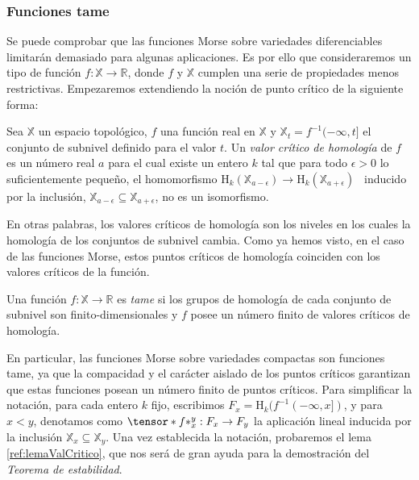 \subsubsection*{Funciones tame}
Se puede comprobar que las funciones Morse sobre variedades diferenciables limitarán demasiado para algunas aplicaciones. Es por ello que consideraremos un tipo de función $f: \mathbb{X} \to \mathbb{R}$, donde $f$ y $\mathbb{X}$ cumplen una serie de propiedades menos restrictivas. Empezaremos extendiendo la noción de punto crítico de la siguiente forma:

\begin{definition}
\begin{sloppypar}
Sea $\mathbb{X}$ un espacio topológico, $f$ una función real en $\mathbb{X}$ y ${\mathbb{X}_t=f^{-1}(-\infty, t]}$ el conjunto de subnivel definido para el valor $t$. Un \emph{valor crítico de homología} de $f$ es un número real $a$ para el cual existe un entero $k$ tal que para todo $\epsilon > 0$ lo suficientemente pequeño, el homomorfismo $\text{H}_k(\mathbb{X}_{a-\epsilon}) \to \text{H}_k(\mathbb{X}_{a+\epsilon})$ \footnotemark \ inducido por la inclusión, $\mathbb{X}_{a-\epsilon} \subseteq \mathbb{X}_{a+\epsilon}$, no es un isomorfismo.
\end{sloppypar}
\end{definition}


En otras palabras, los valores críticos de homología son los niveles en los cuales la homología de los conjuntos de subnivel cambia. Como ya hemos visto, en el caso de las funciones Morse, estos puntos críticos de homología coinciden con los valores críticos de la función.

\begin{definition}
Una función $f: \mathbb{X} \to \mathbb{R}$ es \emph{tame} si los grupos de homología de cada conjunto de subnivel son finito-dimensionales y $f$ posee un número finito de valores críticos de homología.
\end{definition}

\begin{sloppypar}
En particular, las funciones Morse sobre variedades compactas son funciones tame, ya que la compacidad y el carácter aislado de los puntos críticos garantizan que estas funciones posean un número finito de puntos críticos. Para simplificar la notación, para cada entero $k$ fijo, escribimos ${F_x = \text{H}_k(f^{-1}(-\infty, x])}$, y para $x < y$, denotamos como ${\tensor*{f}{*^{y}_{x}}: F_x \to F_y}$ la aplicación lineal inducida por la inclusión $\mathbb{X}_{x} \subseteq \mathbb{X}_{y}$. Una vez establecida la notación, probaremos el lema \ref{ref:lemaValCritico}, que nos será de gran ayuda para la demostración del \emph{Teorema de estabilidad}.
\end{sloppypar}

